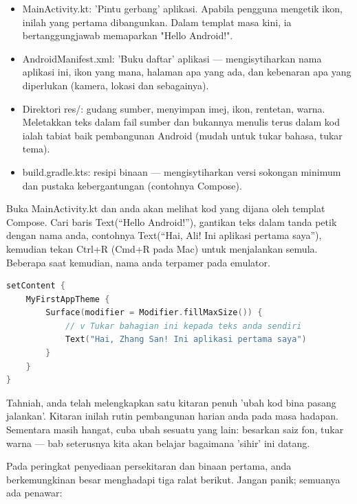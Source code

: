 \begin{itemize}
  \item MainActivity.kt: 'Pintu gerbang' aplikasi. Apabila pengguna mengetik ikon, inilah yang pertama dibangunkan. Dalam templat masa kini, ia bertanggungjawab memaparkan "Hello Android!".
  \item AndroidManifest.xml: 'Buku daftar' aplikasi — mengisytiharkan nama aplikasi ini, ikon yang mana, halaman apa yang ada, dan kebenaran apa yang diperlukan (kamera, lokasi dan sebagainya).
  \item Direktori res/: gudang sumber, menyimpan imej, ikon, rentetan, warna. Meletakkan teks dalam fail sumber dan bukannya menulis terus dalam kod ialah tabiat baik pembangunan Android (mudah untuk tukar bahasa, tukar tema).
  \item build.gradle.kts: resipi binaan — mengisytiharkan versi sokongan minimum dan pustaka kebergantungan (contohnya Compose).
\end{itemize}


Buka MainActivity.kt dan anda akan melihat kod yang dijana oleh templat Compose. Cari baris Text(“Hello Android!”), gantikan teks dalam tanda petik dengan nama anda, contohnya Text(“Hai, Ali! Ini aplikasi pertama saya”), kemudian tekan Ctrl+R (Cmd+R pada Mac) untuk menjalankan semula. Beberapa saat kemudian, nama anda terpamer pada emulator.

\begin{lstlisting}[language=Kotlin]
setContent {
    MyFirstAppTheme {
        Surface(modifier = Modifier.fillMaxSize()) {
            // v Tukar bahagian ini kepada teks anda sendiri
            Text("Hai, Zhang San! Ini aplikasi pertama saya")
        }
    }
}
\end{lstlisting}

Tahniah, anda telah melengkapkan satu kitaran penuh 'ubah kod bina pasang jalankan'. Kitaran inilah rutin pembangunan harian anda pada masa hadapan. Sementara masih hangat, cuba ubah sesuatu yang lain: besarkan saiz fon, tukar warna — bab seterusnya kita akan belajar bagaimana 'sihir' ini datang.


Pada peringkat penyediaan persekitaran dan binaan pertama, anda berkemungkinan besar menghadapi tiga ralat berikut. Jangan panik; semuanya ada penawar:


